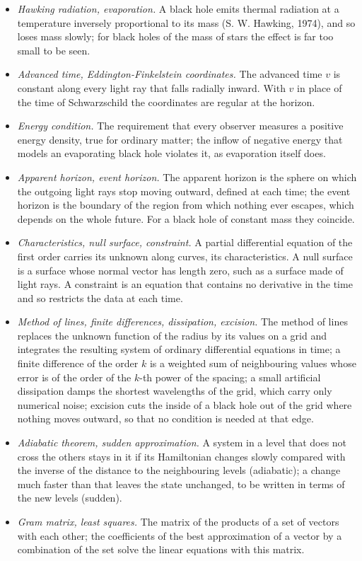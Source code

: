 \documentclass[
  10pt,
]{article}
\providecommand{\tightlist}{%
  \setlength{\itemsep}{0pt}\setlength{\parskip}{0pt}}
\begin{document}
\begin{itemize}
\tightlist
\item
  \emph{Hawking radiation, evaporation.} A black hole emits thermal
  radiation at a temperature inversely proportional to its mass (S. W.
  Hawking, 1974), and so loses mass slowly; for black holes of the mass
  of stars the effect is far too small to be seen.
\item
  \emph{Advanced time, Eddington-Finkelstein coordinates.} The advanced
  time \(v\) is constant along every light ray that falls radially
  inward. With \(v\) in place of the time of Schwarzschild the
  coordinates are regular at the horizon.
\item
  \emph{Energy condition.} The requirement that every observer measures
  a positive energy density, true for ordinary matter; the inflow of
  negative energy that models an evaporating black hole violates it, as
  evaporation itself does.
\item
  \emph{Apparent horizon, event horizon.} The apparent horizon is the
  sphere on which the outgoing light rays stop moving outward, defined
  at each time; the event horizon is the boundary of the region from
  which nothing ever escapes, which depends on the whole future. For a
  black hole of constant mass they coincide.
\item
  \emph{Characteristics, null surface, constraint.} A partial
  differential equation of the first order carries its unknown along
  curves, its characteristics. A null surface is a surface whose normal
  vector has length zero, such as a surface made of light rays. A
  constraint is an equation that contains no derivative in the time and
  so restricts the data at each time.
\item
  \emph{Method of lines, finite differences, dissipation, excision.} The
  method of lines replaces the unknown function of the radius by its
  values on a grid and integrates the resulting system of ordinary
  differential equations in time; a finite difference of the order \(k\)
  is a weighted sum of neighbouring values whose error is of the order
  of the \(k\)-th power of the spacing; a small artificial dissipation
  damps the shortest wavelengths of the grid, which carry only numerical
  noise; excision cuts the inside of a black hole out of the grid where
  nothing moves outward, so that no condition is needed at that edge.
\item
  \emph{Adiabatic theorem, sudden approximation.} A system in a level
  that does not cross the others stays in it if its Hamiltonian changes
  slowly compared with the inverse of the distance to the neighbouring
  levels (adiabatic); a change much faster than that leaves the state
  unchanged, to be written in terms of the new levels (sudden).
\item
  \emph{Gram matrix, least squares.} The matrix of the products of a set
  of vectors with each other; the coefficients of the best approximation
  of a vector by a combination of the set solve the linear equations
  with this matrix.
\end{itemize}
\end{document}
